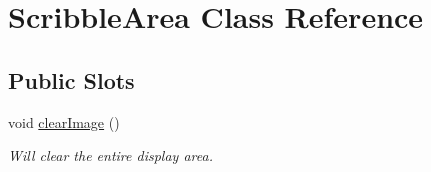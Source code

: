 \hypertarget{classScribbleArea}{\section{\-Scribble\-Area \-Class \-Reference}
\label{classScribbleArea}
}
\subsection*{\-Public \-Slots}
\begin{DoxyCompactItemize}
\item 
\hypertarget{classScribbleArea_a816e9d0163d4b2c921af229bb966197f}{void \hyperlink{classScribbleArea_a816e9d0163d4b2c921af229bb966197f}{clear\-Image} ()}\label{classScribbleArea_a816e9d0163d4b2c921af229bb966197f}

\begin{DoxyCompactList}\small\item\em \-Will clear the entire display area. \end{DoxyCompactList}\end{DoxyCompactItemize}
